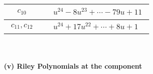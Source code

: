 \documentclass[1p]{elsarticle_modified}
\theoremstyle{definition}
\begin{document}
\begin{tabular}{m{50pt}|m{274pt}}
\hline $$\begin{aligned}c_{10}\end{aligned}$$&$\begin{aligned}
&u^{24}-8 u^{23}+\cdots-79 u+11
\end{aligned}$\\
\hline $$\begin{aligned}c_{11},c_{12}\end{aligned}$$&$\begin{aligned}
&u^{24}+17 u^{22}+\cdots+8 u+1
\end{aligned}$\\
\hline
\end{tabular}\\~\\
\newpage\renewcommand{\arraystretch}{1}
\flushleft \textbf{(v) Riley Polynomials at the component}\newline \\
\end{document}

